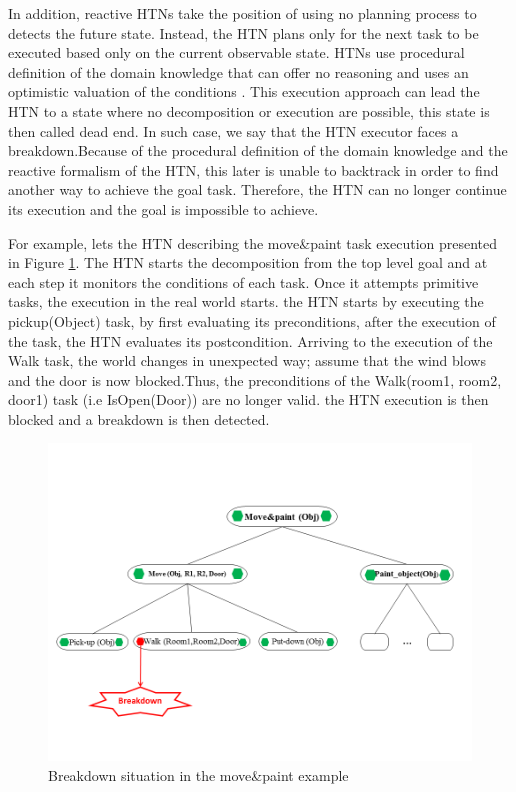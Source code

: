 In addition, reactive HTNs take the position of using no planning process to detects the future state. Instead, the HTN plans only for the next task to be executed  based only on the current observable state. HTNs use procedural definition of the domain knowledge that can offer no reasoning and  uses an optimistic valuation of the conditions . This execution approach can lead the HTN to a state where no decomposition or execution are possible, this state is then called dead end. In such case, we say that the HTN executor faces a breakdown.Because of the procedural definition of the domain knowledge and the reactive formalism of the HTN, this later is unable to backtrack in order to find another way to achieve the goal task.
Therefore, the HTN can no longer continue its execution and the goal is impossible to achieve.

For example, lets the HTN describing the move\&paint task execution presented in Figure \ref{break example}. The HTN starts the decomposition from the top level goal and at each step it monitors the conditions of each task. Once it attempts primitive tasks, the execution in the real world starts. the HTN starts by executing the pickup(Object) task, by first evaluating its preconditions, after the execution of the task, the HTN evaluates its  postcondition. Arriving to the execution of the Walk task,  the world changes in unexpected way; assume that the wind blows and the door is now blocked.Thus, the preconditions of the Walk(room1, room2, door1) task (i.e IsOpen(Door)) are no longer valid. the HTN execution is then blocked and a breakdown is then detected.
 \begin{figure}[h]
 	\centering
 	\includegraphics[width=\textwidth]{Pictures/break.png}
 	\caption{\label{break example} Breakdown situation in the move\&paint example}
 \end{figure}
 
